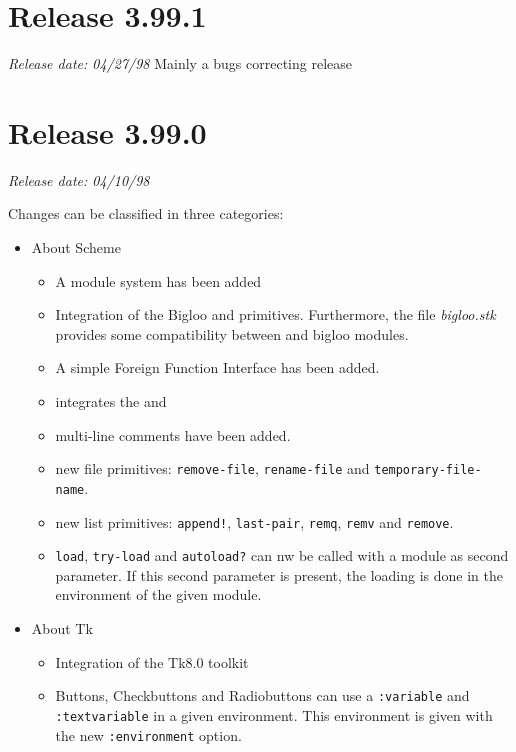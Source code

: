 \section*{Release 3.99.1}
\small{\emph{Release date: 04/27/98}}
Mainly a bugs correcting release

\section*{Release 3.99.0}
\small{\emph{Release date: 04/10/98}}

Changes can be classified in three categories:
\begin{itemize}
\item About Scheme
  \begin{itemize}
  \item A module system has been added
    
  \item Integration of the Bigloo  and
     primitives. Furthermore, the file \emph{bigloo.stk}
    provides some compatibility between {\stk} and bigloo modules.

  \item A simple Foreign Function Interface has been added. 
    
  \item integrates the {\rfive}  and 

  \item multi-line comments have been added.
    
  \item new file primitives: \texttt{remove-file}, \texttt{rename-file} and 
    \texttt{temporary-file-name}.
    
  \item new list primitives: \texttt{append!}, \texttt{last-pair},
    \texttt{remq}, \texttt{remv} and \texttt{remove}.

  \item \texttt{load}, \texttt{try-load} and \texttt{autoload?} can nw
    be called with a module as second parameter. If this second parameter is
    present, the loading is done in the environment of the given module.
  \end{itemize}

\item About Tk
  \begin{itemize}
  \item Integration of the Tk8.0 toolkit
  \item Buttons, Checkbuttons and Radiobuttons can use a
    \texttt{:variable} and \texttt{:textvariable} in a given
    environment. This environment is given with the new \texttt{:environment}
    option.
  \end{itemize}


\end{itemize}
